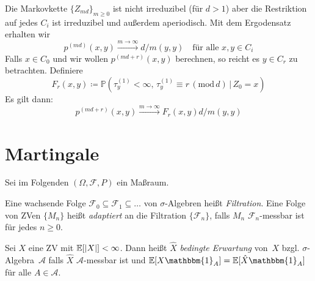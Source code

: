 \documentclass{cheat-sheet}
\renewcommand{\P}{\mathbb{P}} %
\newcommand{\E}{\mathbb{E}} %
\newcommand{\ind}{\mathbbm{1}} %
\newcommand{\iid}{i.\,i.\,d.} %
\newcommand{\Filt}{\mathcal{F}} %
\begin{document}
\begin{bem}
  Die Markovkette $\{ Z_{md} \}_{m \geq 0}$ ist nicht irreduzibel (für $d > 1$) aber die Restriktion auf jedes $C_i$ ist irreduzibel und außerdem aperiodisch.
  Mit dem Ergodensatz erhalten wir
  \[
    p^{(md)}(x, y) \xrightarrow{m \to \infty} d / m(y, y)
    \quad \text{für alle $x, y \in C_i$}
  \]
  Falls $x \in C_0$ und wir wollen $p^{(md + r)}(x, y)$ berechnen, so reicht es $y \in C_r$ zu betrachten.
  Definiere
  \[
    F_r(x, y) \coloneqq \P(\tau_y^{(1)} < \infty, \, \tau_y^{(1)} \equiv r \, (\mathrm{mod}\, d) \,|\, Z_0 = x)
  \]
  Es gilt dann:
  \[
    p^{(md+r)}(x, y) \xrightarrow{m \to \infty} F_r(x, y) d / m(y, y)
  \]
\end{bem}


\section{Martingale}


Sei im Folgenden $(\Omega, \mathcal{F}, P)$ ein Maßraum.

\begin{defn}
  Eine wachsende Folge $\Filt_0 \subseteq \Filt_1 \subseteq \ldots$ von $\sigma$-Algebren heißt \emph{Filtration}.
  Eine Folge von ZVen $\{ M_n \}$ heißt \emph{adaptiert} an die Filtration $\{ \Filt_n \}$, falls $M_n$ $\Filt_n$-messbar ist für jedes $n \geq 0$.
\end{defn}

\begin{defn}
  Sei $X$ eine ZV mit $\E[\abs{X}] < \infty$.
  Dann heißt $\widehat{X}$ \emph{bedingte Erwartung} von~$X$ bzgl. $\sigma$-Algebra~$\mathcal{A}$ falls
  $\hat{X}$ $\mathcal{A}$-messbar ist und $\E[X \ind_A] = \E[\hat{X} \ind_A]$ für alle $A \in \mathcal{A}$.
\end{defn}
\end{document}
